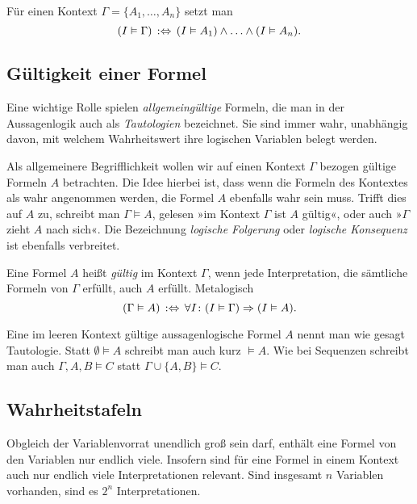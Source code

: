 \begin{Definition}\label{def:sat-context}
Für einen Kontext $\Gamma = \{A_1,\ldots,A_n\}$ setzt man
\[(I\vDash\Gamma)\,:\Leftrightarrow\, (I\vDash A_1)\land\ldots\land (I\vDash A_n).\]
\end{Definition}

\subsection{Gültigkeit einer Formel}

Eine wichtige Rolle spielen \emph{allgemeingültige} Formeln, die man
in der Aussagenlogik auch als \emph{Tautologien}
bezeichnet. Sie sind immer wahr, unabhängig davon, mit welchem
Wahrheitswert ihre logischen Variablen belegt werden.

Als allgemeinere Begrifflichkeit wollen wir auf einen Kontext $\Gamma$
bezogen gültige Formeln $A$ betrachten. Die Idee hierbei ist,
dass wenn die Formeln des Kontextes als wahr angenommen werden, die
Formel $A$ ebenfalls wahr sein muss. Trifft dies auf $A$ zu,
schreibt man $\Gamma\models A$, gelesen »im Kontext $\Gamma$ ist
$A$ gültig«, oder auch »$\Gamma$ zieht $A$ nach sich«. Die Bezeichnung
\emph{logische Folgerung} oder \emph{logische Konsequenz} ist
ebenfalls verbreitet.

\begin{Definition}\label{def:valid}\newlinefirst
Eine Formel $A$ heißt \emph{gültig} im Kontext $\Gamma$,
wenn jede Interpretation, die sämtliche Formeln von $\Gamma$ erfüllt,
auch $A$ erfüllt. Metalogisch
\[(\Gamma\vDash A)\,:\Leftrightarrow\,\forall I\colon (I\vDash\Gamma)\Rightarrow (I\vDash A).\]
\end{Definition}
Eine im leeren Kontext gültige aussagenlogische Formel $A$ nennt man
wie gesagt Tautologie. Statt $\emptyset\models A$ schreibt man auch
kurz $\models A$. Wie bei Sequenzen schreibt man auch $\Gamma,A,B\models C$
statt $\Gamma\cup\{A,B\}\models C$.

\subsection{Wahrheitstafeln}

Obgleich der Variablenvorrat unendlich groß sein darf, enthält eine
Formel von den Variablen nur endlich viele. Insofern sind für eine
Formel in einem Kontext auch nur endlich viele Interpretationen relevant.
Sind insgesamt $n$ Variablen vorhanden, sind es $2^n$ Interpretationen.


